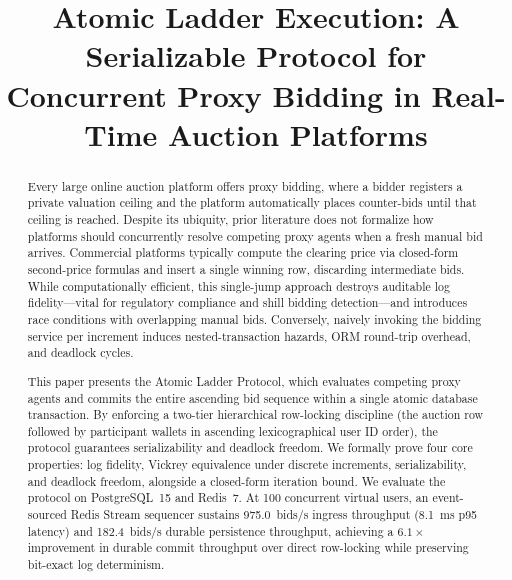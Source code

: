 \documentclass[conference]{IEEEtran}
\begin{document}
\title{Atomic Ladder Execution: A Serializable Protocol for Concurrent
Proxy Bidding in Real-Time Auction Platforms}

\author{
}

\maketitle

\begin{abstract}
Every large online auction platform offers proxy bidding, where a bidder
registers a private valuation ceiling and the platform automatically places
counter-bids until that ceiling is reached. Despite its ubiquity, prior literature
does not formalize how platforms should concurrently resolve competing proxy agents
when a fresh manual bid arrives. Commercial platforms typically compute the clearing
price via closed-form second-price formulas and insert a single winning row,
discarding intermediate bids. While computationally efficient, this single-jump
approach destroys auditable log fidelity---vital for regulatory compliance and
shill bidding detection---and introduces race conditions with overlapping manual
bids. Conversely, naively invoking the bidding service per increment induces
nested-transaction hazards, ORM round-trip overhead, and deadlock cycles.

This paper presents the Atomic Ladder Protocol, which evaluates competing
proxy agents and commits the entire ascending bid sequence within a single
atomic database transaction. By enforcing a two-tier hierarchical row-locking
discipline (the auction row followed by participant wallets in ascending
lexicographical user ID order), the protocol guarantees serializability and
deadlock freedom. We formally prove four core properties: log fidelity,
Vickrey equivalence under discrete increments, serializability, and deadlock
freedom, alongside a closed-form iteration bound. We evaluate the protocol on
PostgreSQL~15 and Redis~7. At 100 concurrent virtual users, an event-sourced
Redis Stream sequencer sustains 975.0~bids/s ingress throughput (8.1~ms p95 latency)
and 182.4~bids/s durable persistence throughput, achieving a $\mathbf{6.1\times}$
improvement in durable commit throughput over direct row-locking while preserving
bit-exact log determinism.
\end{abstract}
\end{document}
